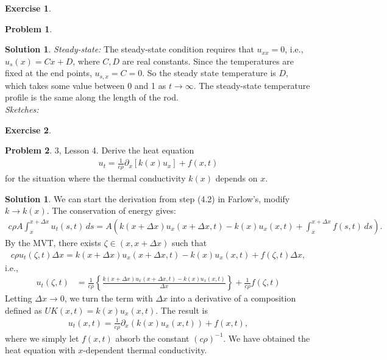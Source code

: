 \documentclass{book}
\theoremstyle{definition}
\newtheorem{sln}{Solution}[section]
\newtheorem*{prob*}{Problem}
\newtheorem*{exer*}{Exercise}
\newtheorem*{sln*}{Solution}
\newcommand{\p}{\partial}
\begin{document}
\begin{exer*}
\begin{prob*}
\begin{sln}
			\textit{Steady-state:} The steady-state condition requires that $u_{xx} = 0$, i.e., $u_s(x) = Cx + D$, where $C,D$ are real constants. Since the temperatures are fixed at the end points, $u_{s,x} = C = 0$. So the steady state temperature is $D$, which takes some value between 0 and 1 as $t\to \infty$. The steady-state temperature profile is the same along the length of the rod. \\
			
			\textit{Sketches:}
		\end{sln}
	\end{prob*}
\end{exer*}

\newpage


\begin{exer*}
	\begin{prob*}3, Lesson 4. Derive the heat equation
		\begin{align*}
		u_t = \frac{1}{c\rho}\p_x[k(x)u_x] + f(x,t)
		\end{align*}
		for the situation where the thermal conductivity $k(x)$ depends on $x$.\\
		\begin{sln*}
			We can start the derivation from step (4.2) in Farlow's, modify $k \to k(x)$. The conservation of energy gives:
			\begin{align*}
			c\rho A\int_{x}^{x+\Delta x}u_t(s,t)\,ds = A\left(k(x+\Delta x)u_x(x+\Delta x,t) - k(x)u_x(x,t)  + \int_x^{x+\Delta x}f(s,t)\,ds \right).
			\end{align*}
			By the MVT, there exists $\zeta \in (x,x+\Delta x)$ such that
			\begin{align*}
			c\rho u_t(\zeta, t)\Delta x = k(x+\Delta x)u_x(x+\Delta x,t) - k(x)u_x(x,t) + f(\zeta,t)\Delta x,
			\end{align*} 
			i.e.,
			\begin{align*}
			u_t(\zeta,t) &= \frac{1}{c\rho}\left\{ \frac{k(x+\Delta x)u_x(x+\Delta x,t) - k(x)u_x(x,t)}{\Delta x} \right\} + \frac{1}{c\rho}f(\zeta,t)
			\end{align*}
			Letting $\Delta x \to 0$, we turn the term with $\Delta x$ into a derivative of a composition defined as $UK(x,t) = k(x)u_x(x,t)$. The result is
			\begin{align*}
			u_t(x,t) = \frac{1}{c\rho}\p_x(k(x)u_x(x,t)) + f(x,t),
			\end{align*}
			where we simply let $f(x,t)$ absorb the constant $(c\rho)^{-1}$. We have obtained the heat equation with $x$-dependent thermal conductivity. 
		\end{sln*}
	\end{prob*}
\end{exer*}
\end{document}

